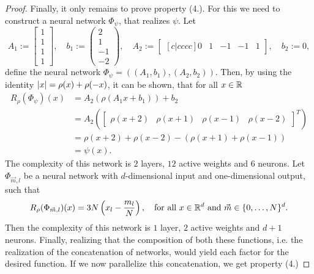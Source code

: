 \begin{proof}
    Finally, it only remains to prove property (4.). For this we need to construct a neural network 
    $\Phi_\psi$, that realizes $\psi$. Let
    \begin{equation*}
        A_1 := \begin{bmatrix}
            1 \\ 1 \\ 1 \\ 1
        \end{bmatrix}, \quad
        b_1 := \begin{pmatrix}
            2 \\ 1 \\ -1 \\ -2
        \end{pmatrix}, \quad
        A_2 := \begin{bmatrix}[c|cccc]
            0 & 1 & -1 & -1 & 1
        \end{bmatrix}, \quad
        b_2 := 0,
    \end{equation*}
    define the neural network $\Phi_\psi = ((A_1, b_1), (A_2, b_2))$. Then, by using the identity $\lvert x \rvert = \rho(x)+\rho(-x)$, 
    it can be shown, that for all $x \in \mathbb{R}$
    \begin{align*}
        R_\rho(\Phi_\psi)(x) &= A_2(\rho(A_1x + b_1)) + b_2 \\
        &= A_2\left(\begin{bmatrix}
            \rho(x + 2) & \rho(x + 1) & \rho(x - 1) & \rho(x - 2)
        \end{bmatrix}^T\right) \\
        &= \rho(x + 2) + \rho(x - 2) - (\rho(x + 1) + \rho(x - 1)) \\
        &= \psi(x).
    \end{align*}
    The complexity of this network is $2$ layers, $12$ active weights and $6$ neurons.
    Let $\Phi_{\vec{m}, l}$ be a neural network with $d$-dimensional input and one-dimensional output, such that
    \begin{equation*}
        R_\rho(\Phi_{\vec{m}, l})(x) = 3N \left( x_l - \frac{m_l}{N} \right), 
        \quad \text{for all } x \in \mathbb{R}^d \text{ and } \vec{m} \in \{0, \dots, N\}^d.
    \end{equation*}
    Then the complexity of this network is $1$ layer, $2$ active weights and $d+1$ neurons. Finally, realizing
    that the composition of both these functions, i.e. the realization of the concatenation of networks, would yield
    each factor for the desired function. If we now parallelize this concatenation, we get property (4.)

\end{proof}
